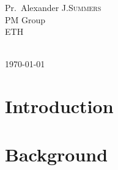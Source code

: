 \documentclass[titlepage,11pt,a4paper]{report}
\theoremstyle{plain}
\newcommand\blankpage{%
    \null
    \thispagestyle{empty}%
    \addtocounter{page}{-1}%
    \newpage}
\begin{document}
\begin{titlepage}
\begin{minipage}{0.4\textwidth}
\begin{flushright}
\large
Pr.~Alexander J.\textsc{Summers}\\ %
\small
PM Group\\
ETH
\end{flushright}
\end{minipage}\\[2cm]



{\large \today}\\[2cm] %


 

\vfill %

\afterpage{\blankpage}

\end{titlepage}




\tableofcontents

\afterpage{\blankpage}


\chapter{Introduction}

\chapter{Background}
\label{ch:background}

\end{document}
